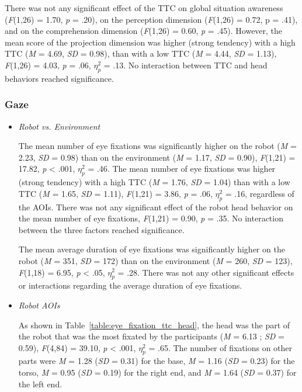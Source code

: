 \documentclass[a4paper,11pt,twoside]{StyleThese}
\begin{document}
There was not any significant effect of the TTC on global situation awareness (\textit{F}(1,26) = 1.70, \textit{p} = .20), on the perception dimension (\textit{F}(1,26) = 0.72, p = .41), and on the comprehension dimension (\textit{F}(1,26) = 0.60, \textit{p} = .45). However, the mean score of the projection dimension was higher (strong tendency) with a high TTC (\textit{M} = 4.69, \textit{SD} = 0.98), than with a low TTC (\textit{M} = 4.44, \textit{SD} = 1.13), \textit{F}(1,26) = 4.03, \textit{p} = .06, $\eta_{p}^{2}$ = .13. No interaction between TTC and head behaviors reached significance.

\subsubsection{Gaze}
\begin{itemize}
\item  \textit{Robot vs. Environment}

The mean number of eye fixations was significantly higher on the robot (\textit{M} = 2.23, \textit{SD} = 0.98) than on the environment (\textit{M} = 1.17, \textit{SD} = 0.90), \textit{F}(1,21) = 17.82, \textit{p} < .001, $\eta_{p}^{2}$ = .46.
The mean number of eye fixations was higher (strong tendency) with a high TTC (\textit{M} = 1.76, \textit{SD} =  1.04) than with a low TTC (\textit{M} = 1.65, \textit{SD} = 1.11), \textit{F}(1,21) = 3.86, \textit{p} = .06, $\eta_{p}^{2}$ = .16, regardless of the AOIs. There was not any significant effect of the robot head behavior on the mean number of eye fixations, \textit{F}(1,21) = 0.90, \textit{p} = .35. No interaction between the three factors reached significance.

The mean average duration of eye fixations was significantly higher on the robot (\textit{M} = 351, \textit{SD} =  172) than on the environment (\textit{M} = 260, \textit{SD} = 123), \textit{F}(1,18) = 6.95, \textit{p} < .05, $\eta_{p}^{2}$ = .28. There was not any other significant effects or interactions regarding the average duration of eye fixations.

\item \textit{Robot AOIs}

As shown in Table~\ref{table:eye_fixation_ttc_head}, the head was the part of the robot that was the most fixated by the participants (\textit{M} = 6.13 ; \textit{SD} = 0.59), \textit{F}(4,84) = 39.10, \textit{p} < .001, $\eta_{p}^{2}$ = .65. The number of fixations on other parts were \textit{M} = 1.28 (\textit{SD} = 0.31) for the base, \textit{M} = 1.16 (\textit{SD} = 0.23) for the torso, \textit{M} = 0.95 (\textit{SD} = 0.19) for the right end, and \textit{M} = 1.64 (\textit{SD} = 0.37) for the left end. 


\end{itemize}
\end{document}
